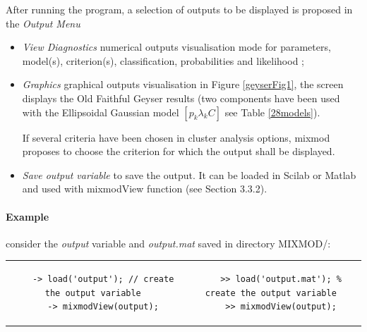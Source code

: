 After running the program, a selection of outputs to be
displayed is proposed in the {\em Output Menu}
\begin{itemize}
 \item {\em View Diagnostics } numerical outputs visualisation mode for
                                 parameters, model(s), criterion(s), classification, probabilities and likelihood ;
 \item {\em  Graphics} graphical outputs visualisation
                         in Figure \ref{geyserFig1}, the screen displays the Old
                         Faithful Geyser results (two components have been used with the
                         Ellipsoidal Gaussian model $[p_k\lambda_kC]$ see Table \ref{28models}).

                          If several criteria have been chosen in cluster analysis options, {\sc mixmod}
                          proposes to choose the criterion for which the output shall be
                          displayed.
 \item {\em Save output variable} to save the output. It can be loaded in Scilab or Matlab
                                    and used with mixmodView function (see Section 3.3.2).\\
\end{itemize}


\paragraph{Example } consider the {\em output} variable and {\em output.mat} saved in directory MIXMOD/:

\begin{tabular}{c|c}
\begin{minipage}[c]{0.50\columnwidth}%
{\scriptsize
\begin{verbatim}
    -> load('output'); // create the output variable
    -> mixmodView(output);
\end{verbatim}}
\end{minipage}%
&
\begin{minipage}[c]{0.50\columnwidth}%
{\scriptsize
\begin{verbatim}
    >> load('output.mat'); % create the output variable
    >> mixmodView(output);
\end{verbatim}}
\end{minipage}%
\end{tabular}





